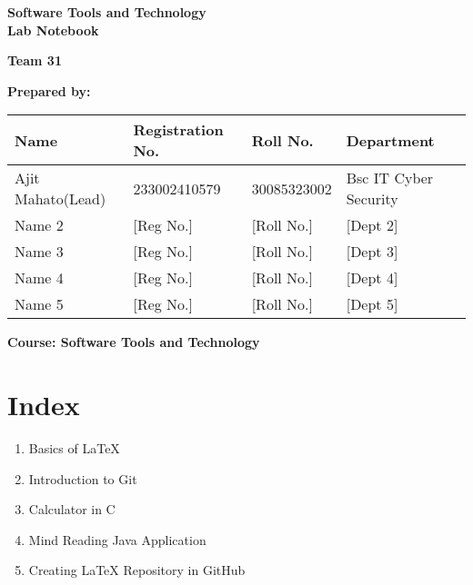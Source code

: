 

\begin{titlepage}
    \centering
    \vspace*{2cm}
    
    {\Huge\bfseries Software Tools and Technology \\[0.4cm] Lab Notebook \\[2cm]}
    
    {\Large\textbf{Team 31}\\[1.5cm]}
    
    \vspace{0.5cm}
    \textbf{Prepared by:}\\[0.5cm]
    
    \vspace{1cm}
    \begin{tabular}{|l|l|l|l|}
    \hline
    \textbf{Name} & \textbf{Registration No.} & \textbf{Roll No.} & \textbf{Department} \\
    \hline
     Ajit Mahato(Lead)& 233002410579& 30085323002& Bsc IT Cyber Security\\
    Name 2 & [Reg No.] & [Roll No.] & [Dept 2] \\
    Name 3 & [Reg No.] & [Roll No.] & [Dept 3] \\
    Name 4 & [Reg No.] & [Roll No.] & [Dept 4] \\
    Name 5 & [Reg No.] & [Roll No.] & [Dept 5] \\
    \hline
    \end{tabular}
    
    \vspace{2cm}
    
    \vfill
    \textbf{Course: Software Tools and Technology}
    
\end{titlepage}

\newpage
\chapter*{Index}

\begin{enumerate}
    \item Basics of LaTeX 
    \item Introduction to Git 
    \item Calculator in C 
    \item Mind Reading Java Application 
    \item Creating LaTeX Repository in GitHub 
\end{enumerate}

